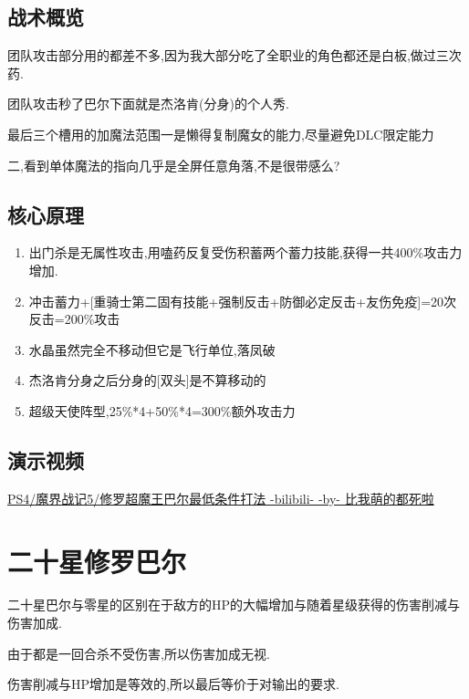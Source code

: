 	\subsection{战术概览}

	团队攻击部分用{\color{red}{大魔拳超魔流刷过全职业}}的都差不多,因为我大部分吃了全职业的角色都还是白板,做过三次药.

	团队攻击秒了巴尔下面就是杰洛肯(分身)的个人秀.

	最后三个槽用的加魔法范围一是懒得复制魔女的能力,尽量避免DLC限定能力
	
	二,看到单体魔法的指向几乎是全屏任意角落,不是很带感么?

	\subsection{核心原理}

	\begin{enumerate}
		\item 出门杀是无属性攻击,用嗑药反复受伤积蓄两个蓄力技能,获得一共400\%攻击力增加.

		\item 冲击蓄力+[重骑士第二固有技能+强制反击+防御必定反击+友伤免疫]=20次反击=200\%攻击

		\item 水晶虽然完全不移动但它是飞行单位,落凤破

		\item 杰洛肯分身之后分身的[双头]是不算移动的
		
		\item 超级天使阵型,25\%*4+50\%*4=300\%额外攻击力
	\end{enumerate}

	\subsection{演示视频}
	\href{http://www.bilibili.com/video/av2976870/}{PS4/魔界战记5/修罗超魔王巴尔最低条件打法 -bilibili- -by- 比我萌的都死啦}


	\newpage

	\section{二十星修罗巴尔}

	二十星巴尔与零星的区别在于敌方的HP的大幅增加与随着星级获得的伤害削减与伤害加成.

	由于都是一回合杀不受伤害,所以伤害加成无视.

	伤害削减与HP增加是等效的,所以最后等价于对输出的要求.

